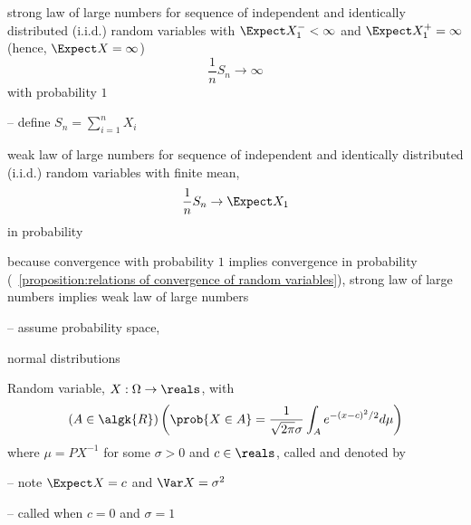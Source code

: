 \documentclass[17pt,landscape]{foils}
\newcommand\normal{\mathcalfont{N}}
\newcommand{\algF}{\algk{F}}
\newcommand{\algR}{\algk{R}}
\begin{document}
{\begin{mycorollary}{strong law of large numbers}
	for sequence of independent and identically distributed (i.i.d.) random variables
	with $\Expect X_1^- < \infty$ and $\Expect X_1^+ = \infty$ (hence, $\Expect X = \infty$)
	$$
		\frac{1}{n} S_n \to \infty
	$$
	with probability $1$
\end{mycorollary}



-- define $S_n = \sum_{i=1}^n X_i$

\begin{mytheorem}{weak law of large numbers}%
	for sequence of independent and identically distributed (i.i.d.) random variables
	with finite mean, 
	$$
		\frac{1}{n} S_n \to \Expect X_1
	$$
	in probability
\end{mytheorem}

\bit
	\item
		because convergence with probability $1$ implies convergence in probability
		(\propositionname~\ref{proposition:relations of convergence of random variables}),
		strong law of large numbers
		implies
		weak law of large numbers
\eit


%

-- assume probability space, \meas{\Omega}{\algF}{P}\

\begin{mydefinition}{normal distributions}%

	Random variable, $X:\Omega\to\reals$, with
	$$
		\left(
			A\in\algR
		\right)
		\left(
			\prob{X\in A} = \frac{1}{\sqrt{2\pi}\sigma} \int_A e^{-(x-c)^2/2} d\mu
		\right)
	$$
	where $\mu=PX^{-1}$
	for some $\sigma>0$ and $c\in\reals$,
	called 
	and denoted by \define{$X \sim \normal(c,\sigma^2)$}
\end{mydefinition}

\bit
\item [--]
	note $\Expect X=c$ and $\Var X=\sigma^2$
\item [--]
	called 
	when $c=0$ and $\sigma=1$%
\eit


}
\end{document}
